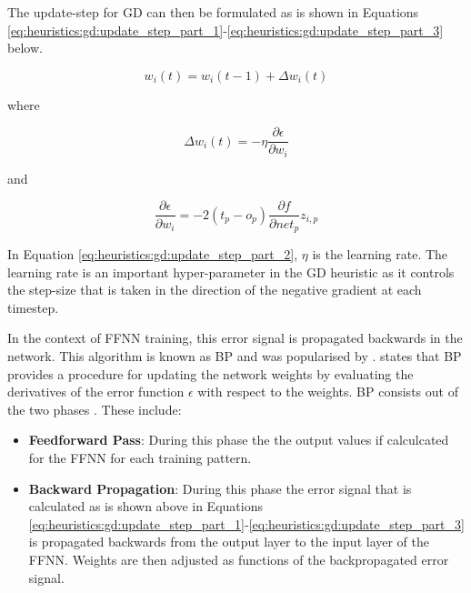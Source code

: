 The update-step for \ac{GD} can then be formulated as is shown in Equations \ref{eq:heuristics:gd:update_step_part_1}-\ref{eq:heuristics:gd:update_step_part_3} below.

\begin{equation}
      \label{eq:heuristics:gd:update_step_part_1}
      w_{i}(t) = w_{i}(t-1) + \Delta w_{i}(t)
\end{equation}

where

\begin{equation}
      \label{eq:heuristics:gd:update_step_part_2}
      \Delta w_{i}(t) = -\eta\frac{\partial \epsilon}{\partial w_{i}}
\end{equation}

and

\begin{equation}
      \label{eq:heuristics:gd:update_step_part_3}
      \frac{\partial \epsilon}{\partial w_{i}} = -2(t_{p} - o_{p})\frac{\partial f}{\partial net_{p}}z_{i,p}
\end{equation}

In Equation \ref{eq:heuristics:gd:update_step_part_2}, $\eta$ is the learning rate. The learning rate is an important hyper-parameter in the \ac{GD} heuristic as it controls the step-size that is taken in the direction of the negative gradient at each timestep.

In the context of \ac{FFNN} training, this error signal is propagated backwards in the network. This algorithm is known as \ac{BP} and was popularised by \citeauthor{ref:werbos:1994} \cite{ref:werbos:1994}. \citeauthor{ref:nel:2021} \cite{ref:nel:2021} states that \ac{BP} provides a procedure for updating the network weights by evaluating the derivatives of the error function $\epsilon$ with respect to the weights. \Ac{BP} consists out of the two phases \cite{ref:engelbrecht:2007}. These include:

\begin{itemize}
      \item \textbf{Feedforward Pass}: During this phase the the output values if calculcated for the \ac{FFNN} for each training pattern.
      \item \textbf{Backward Propagation}: During this phase the error signal that is calculated as is shown above in Equations \ref{eq:heuristics:gd:update_step_part_1}-\ref{eq:heuristics:gd:update_step_part_3} is propagated backwards from the output layer to the input layer of the \ac{FFNN}. Weights are then adjusted as functions of the backpropagated error signal.
\end{itemize}

